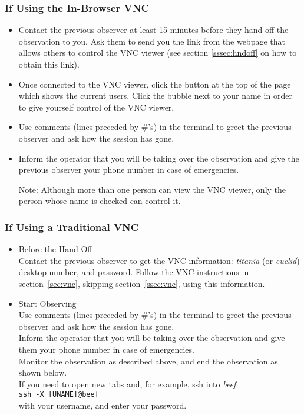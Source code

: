\documentclass[11pt]{article}
\begin{document}
 \subsubsection{If Using the In-Browser VNC} \begin{itemize}
 \item Contact the previous observer at least 15 minutes before they hand off the observation to you. Ask them to send you the link from the webpage that allows others to control the VNC viewer (see section \ref{sssec:hndoff} on how to obtain this link).
 \item Once connected to the VNC viewer, click the button at the top of the page which shows the current users. Click the bubble next to your name in order to give yourself control of the VNC viewer. 
 \item Use comments (lines preceded by \#'s) in the terminal to greet the previous observer and ask how the session has gone.  
 \item Inform the operator that you will be taking over the observation and give the previous observer your phone number in case of emergencies.  

 Note: Although more than one person can view the VNC viewer, only the person whose name is checked can control it.
\end{itemize}

 \subsubsection{If Using a Traditional VNC} \begin{itemize}
 \item Before the Hand-Off \\
 Contact the previous observer to get the VNC information: \textit{titania} (or \textit{euclid}) desktop number, and password.  Follow the VNC instructions in section~\ref{sec:vnc}, skipping section~\ref{ssec:vnc}, using this information.  

 \item Start Observing \\
 Use comments (lines preceded by \#'s) in the terminal to greet the previous observer and ask how the session has gone.  \\
 Inform the operator that you will be taking over the observation and give them your phone number in case of emergencies.  \\
 Monitor the observation as described above, and end the observation as shown below.  \\
 If you need to open new tabs and, for example, ssh into \textit{beef}: \\
 \texttt{ssh -X [UNAME]@beef} \\
 with your username, and enter your password. 
\end{itemize}
\end{document}
